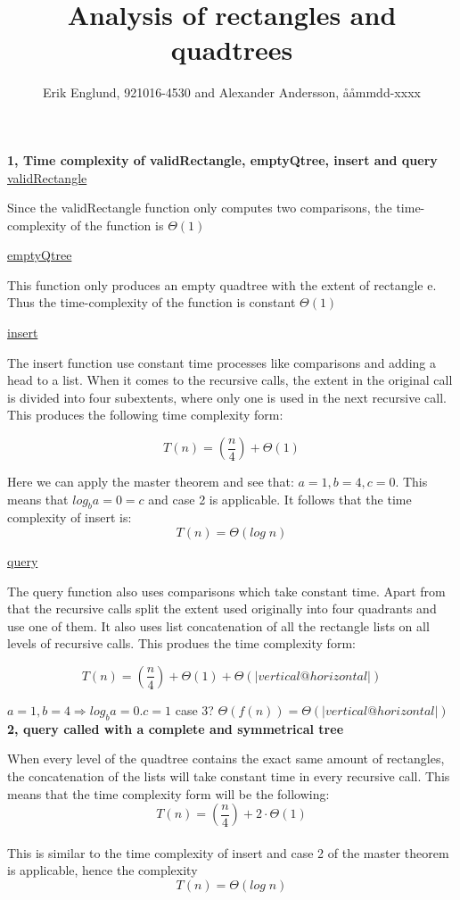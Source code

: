 \documentclass[12pt, a4paper]{article}
\title{Analysis of rectangles and quadtrees}
\author{Erik Englund, 921016-4530 and Alexander Andersson, ååmmdd-xxxx}
\begin{document}
\maketitle

\textbf{1, Time complexity of validRectangle, emptyQtree, insert and query}\\

\underline{validRectangle}

Since the validRectangle function only computes two comparisons, the time-complexity of the function is 
$\Theta(1)$




\underline{emptyQtree}

This function only produces an empty quadtree with the extent of rectangle e. Thus the time-complexity of the function is constant $\Theta(1)$



\underline{insert}

The insert function use constant time processes like comparisons and adding a head to a list. When it comes to the recursive calls, the extent in the original call is divided into four subextents, where only one is used in the next recursive call. This produces the following time complexity form:

$$T(n)=\left(\frac{n}{4}\right)+\Theta(1)$$

Here we can apply the master theorem and see that: $a=1, b=4, c=0$. This means that $log_ba=0 = c$ and case 2 is applicable. It follows that the time complexity of insert is: $$T(n)=\Theta(log\;n)$$





\underline{query}

The query function also uses comparisons which take constant time. Apart from that the recursive calls split the extent used originally into four quadrants and use one of them. It also uses list concatenation of all the rectangle lists on all levels of recursive calls. This produes the time complexity form:

$$T(n)=\left(\frac{n}{4}\right)+\Theta(1)+\Theta(|vertical@horizontal|)$$

$a=1, b=4 \Rightarrow log_ba=0. c = 1$
case 3? $\Theta(f(n))=\Theta(|vertical@horizontal|)$
\\
\textbf{2, query called with a complete and symmetrical tree}

When every level of the quadtree contains the exact same amount of rectangles, the concatenation of the lists will take constant time in every recursive call. This means that the time complexity form will be the following: $$T(n)=\left(\frac{n}{4}\right)+2\cdot\Theta(1)$$\\

This is similar to the time complexity of insert and case 2 of the master theorem is applicable, hence the complexity $$T(n)=\Theta(log\;n)$$
\end{document}
